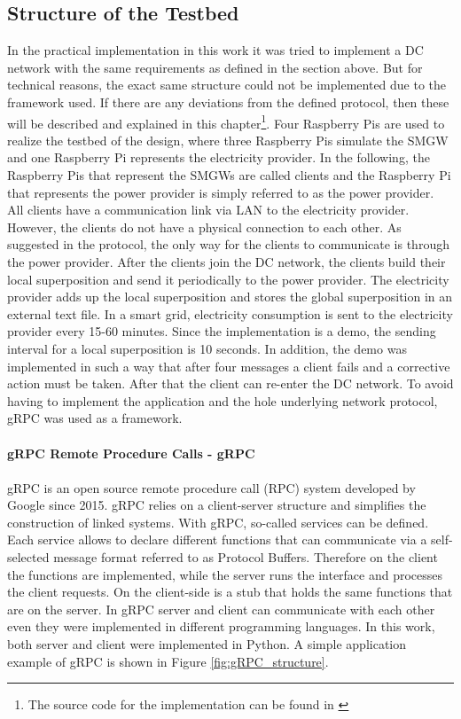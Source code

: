 \subsection{Structure of the Testbed}
In the practical implementation in this work it was tried to implement a DC network with the same requirements as defined in the section above. But for technical reasons, the exact same structure could not be implemented due to the framework used. If there are any deviations from the defined protocol, then these will be described and explained in this chapter\footnote[5]{The source code for the implementation can be found in \cite{Impl}}.
Four Raspberry Pis are used to realize the testbed of the design, where three Raspberry Pis simulate the SMGW and one Raspberry Pi represents the electricity provider. In the following, the Raspberry Pis that represent the SMGWs are called clients and the Raspberry Pi that represents the power provider is simply referred to as the power provider. All clients have a communication link via LAN to the electricity provider. However, the clients do not have a physical connection to each other. As suggested in the protocol, the only way for the clients to communicate is through the power provider. After the clients join the DC network, the clients build their local superposition and send it periodically to the power provider. The electricity provider adds up the local superposition and stores the global superposition in an external text file. In a smart grid, electricity consumption is sent to the electricity provider every 15-60 minutes. Since the implementation is a demo, the sending interval for a local superposition is 10 seconds. In addition, the demo was implemented in such a way that after four messages a client fails and a corrective action must be taken. After that the client can re-enter the DC network. To avoid having to implement the application and the hole underlying network protocol, gRPC was used as a framework.\\
\\
\textbf{gRPC Remote Procedure Calls - gRPC}
\\
\\
gRPC \cite{gRPC} is an open source remote procedure call (RPC) system developed by Google since 2015. gRPC relies on a client-server structure and simplifies the construction of linked systems. With gRPC, so-called services can be defined. Each service allows to declare different functions that can communicate via a self-selected message format referred to as Protocol Buffers. Therefore on the client the functions are implemented, while the server runs the interface and processes the client requests. On the client-side is a stub that holds the same functions that are on the server. In gRPC server and client can communicate with each other even they were implemented in different programming languages. In this work, both server and client were implemented in Python. A simple application example of gRPC is shown in Figure \ref{fig:gRPC_structure}.
